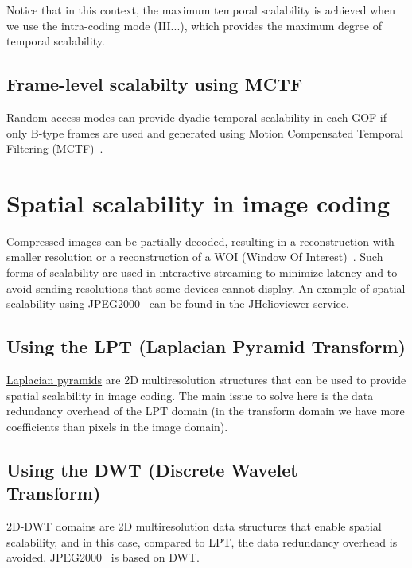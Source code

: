 Notice that in this context, the maximum temporal scalability is
achieved when we use the intra-coding mode (III...), which provides
the maximum degree of temporal scalability.

\subsection{Frame-level scalabilty using MCTF}

Random access modes can provide dyadic temporal scalability in each
GOF if only B-type frames are used and generated using Motion
Compensated Temporal Filtering (MCTF)~\cite{vruiz__MC,vruiz__MCTF}.


\section{Spatial scalability in image coding~\cite{vruiz__JPEG2000}}


Compressed images can be partially decoded, resulting in a
reconstruction with smaller resolution or a reconstruction of a WOI
(Window Of Interest)~\cite{vruiz__JPEG2000}. Such forms of scalability
are used in interactive streaming to minimize latency and to avoid
sending resolutions that some devices cannot display. An example of
spatial scalability using JPEG2000~\cite{vruiz__JPEG2000} can be found
in the \href{https://www.jhelioviewer.org/}{JHelioviewer service}.

\subsection{Using the LPT (Laplacian Pyramid Transform)}

\href{https://en.wikipedia.org/wiki/Pyramid_(image_processing)#Laplacian_pyramid}{Laplacian
  pyramids} are 2D multiresolution structures that can be used to
provide spatial scalability in image coding. The main issue to solve
here is the data redundancy overhead of the LPT domain (in the
transform domain we have more coefficients than pixels in the image
domain).

\subsection{Using the DWT (Discrete Wavelet Transform)~\cite{vruiz__JPEG2000}}

2D-DWT domains are 2D multiresolution data structures that enable
spatial scalability, and in this case, compared to LPT, the data
redundancy overhead is avoided. JPEG2000~\cite{vruiz__JPEG2000} is
based on DWT.

